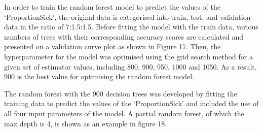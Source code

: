 \documentclass[smallextended]{svjour3}       %
\begin{document}




In order to train the random forest model to predict the values of the ‘ProportionSick’, the original data is categorised into train, test, and validation data in the ratio of 7:1.5:1.5. Before fitting the model with the train data, various numbers of trees with their corresponding accuracy scores are calculated and presented on a validation curve plot as shown in Figure 17. Then, the hyperparameter for the model was optimised using the grid search method for a given set of estimator values, including 800, 900, 950, 1000 and 1050. As a result, 900 is the best value for optimising the random forest model.

The random forest with the 900 decision trees was developed by fitting the training data to predict the values of the ‘ProportionSick’ and included the use of all four input parameters of the model. A partial random forest, of which the max depth is 4, is shown as an example in figure 18.
\end{document}
